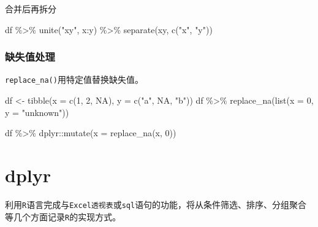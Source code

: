 \documentclass[
]{book}
\newenvironment{Shaded}{\begin{snugshade}}{\end{snugshade}}
\newcommand{\AttributeTok}[1]{\textcolor[rgb]{0.77,0.63,0.00}{#1}}
\newcommand{\ConstantTok}[1]{\textcolor[rgb]{0.00,0.00,0.00}{#1}}
\newcommand{\DecValTok}[1]{\textcolor[rgb]{0.00,0.00,0.81}{#1}}
\newcommand{\FunctionTok}[1]{\textcolor[rgb]{0.00,0.00,0.00}{#1}}
\newcommand{\NormalTok}[1]{#1}
\newcommand{\OtherTok}[1]{\textcolor[rgb]{0.56,0.35,0.01}{#1}}
\newcommand{\SpecialCharTok}[1]{\textcolor[rgb]{0.00,0.00,0.00}{#1}}
\newcommand{\StringTok}[1]{\textcolor[rgb]{0.31,0.60,0.02}{#1}}
\begin{document}
合并后再拆分

\begin{Shaded}
\begin{Highlighting}[]
\NormalTok{df }\SpecialCharTok{\%\textgreater{}\%}
  \FunctionTok{unite}\NormalTok{(}\StringTok{"xy"}\NormalTok{, x}\SpecialCharTok{:}\NormalTok{y) }\SpecialCharTok{\%\textgreater{}\%}
  \FunctionTok{separate}\NormalTok{(xy, }\FunctionTok{c}\NormalTok{(}\StringTok{"x"}\NormalTok{, }\StringTok{"y"}\NormalTok{))}
\end{Highlighting}
\end{Shaded}

\hypertarget{ux7f3aux5931ux503cux5904ux7406}{%
\subsection{缺失值处理}\label{ux7f3aux5931ux503cux5904ux7406}}

\texttt{replace\_na()}用特定值替换缺失值。

\begin{Shaded}
\begin{Highlighting}[]
\NormalTok{df }\OtherTok{\textless{}{-}} \FunctionTok{tibble}\NormalTok{(}\AttributeTok{x =} \FunctionTok{c}\NormalTok{(}\DecValTok{1}\NormalTok{, }\DecValTok{2}\NormalTok{, }\ConstantTok{NA}\NormalTok{), }\AttributeTok{y =} \FunctionTok{c}\NormalTok{(}\StringTok{"a"}\NormalTok{, }\ConstantTok{NA}\NormalTok{, }\StringTok{"b"}\NormalTok{))}
\NormalTok{df }\SpecialCharTok{\%\textgreater{}\%} \FunctionTok{replace\_na}\NormalTok{(}\FunctionTok{list}\NormalTok{(}\AttributeTok{x =} \DecValTok{0}\NormalTok{, }\AttributeTok{y =} \StringTok{"unknown"}\NormalTok{))}
\end{Highlighting}
\end{Shaded}

\begin{Shaded}
\begin{Highlighting}[]
\NormalTok{df }\SpecialCharTok{\%\textgreater{}\%}\NormalTok{ dplyr}\SpecialCharTok{::}\FunctionTok{mutate}\NormalTok{(}\AttributeTok{x =} \FunctionTok{replace\_na}\NormalTok{(x, }\DecValTok{0}\NormalTok{))}
\end{Highlighting}
\end{Shaded}

\hypertarget{dplyr}{%
\chapter{dplyr}\label{dplyr}}

利用\texttt{R}语言完成与\texttt{Excel透视表}或\texttt{sql}语句的功能，将从条件筛选、排序、分组聚合等几个方面记录\texttt{R}的实现方式。
\end{document}
